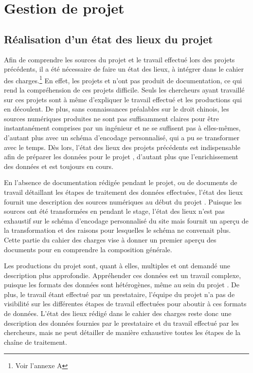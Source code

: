 \section{Gestion de projet}
    \subsection{Réalisation d’un état des lieux du projet}

Afin de comprendre les sources du projet \COREL et le travail effectué lors des projets précédents, il a été nécessaire de faire un état des lieux, à intégrer dans le cahier des charges.\footnote{Voir l'annexe A} En effet, les projets \LSC et \EPJ n'ont pas produit de documentation, ce qui rend la compréhension de ces projets difficile. Seuls les chercheurs ayant travaillé sur ces projets sont à même d'expliquer le travail effectué et les productions qui en découlent. De plus, sans connaissances préalables sur le droit chinois, les sources numériques produites ne sont pas suffisamment claires pour être instantanément comprises par un ingénieur et ne se suffisent pas à elles-mêmes, d'autant plus avec un schéma d'encodage personnalisé, qui a pu se transformer avec le temps. Dès lors, l'état des lieux des projets précédents est indispensable afin de préparer les données pour le projet \COREL, d'autant plus que l'enrichissement des données \LSC et \EPJ est toujours en cours. 

En l'absence de documentation rédigée pendant le projet, ou de documents de travail détaillant les étapes de traitement des données effectuées, l'état des lieux fournit une description des sources numériques au début du projet \COREL. Puisque les sources \XML ont été transformées en \TEI pendant le stage, l'état des lieux n'est pas exhaustif sur le schéma d'encodage personnalisé du site \LSC mais fournit un aperçu de la transformation \XSLT et des raisons pour lesquelles le schéma \LSC ne convenait plus. Cette partie du cahier des charges vise à donner un premier aperçu des documents pour en comprendre la composition générale. 

Les productions du projet \EPJ sont, quant à elles, multiples et ont demandé une description plus approfondie. Appréhender ces données est un travail complexe, puisque les formats des données sont hétérogènes, même au sein du projet \EPJ. De plus, le travail étant effectué par un prestataire, l'équipe du projet n'a pas de visibilité sur les différentes étapes de travail effectuées pour aboutir à ces formats de données. L'état des lieux rédigé dans le cahier des charges reste donc une description des données fournies par le prestataire et du travail effectué par les chercheurs, mais ne peut détailler de manière exhaustive toutes les étapes de la chaîne de traitement.

